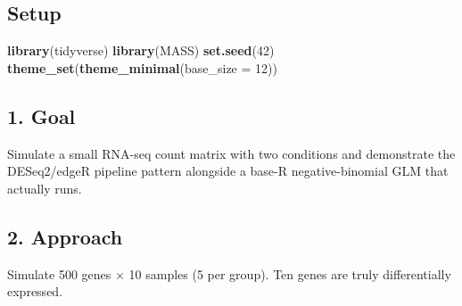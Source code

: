\documentclass[
]{article}
\newenvironment{Shaded}{\begin{snugshade}}{\end{snugshade}}
\newcommand{\AttributeTok}[1]{\textcolor[rgb]{0.13,0.29,0.53}{#1}}
\newcommand{\DecValTok}[1]{\textcolor[rgb]{0.00,0.00,0.81}{#1}}
\newcommand{\FunctionTok}[1]{\textcolor[rgb]{0.13,0.29,0.53}{\textbf{#1}}}
\newcommand{\NormalTok}[1]{#1}
\begin{document}
\subsection{Setup}\label{setup}

\begin{Shaded}
\begin{Highlighting}[]
\FunctionTok{library}\NormalTok{(tidyverse)}
\FunctionTok{library}\NormalTok{(MASS)}
\FunctionTok{set.seed}\NormalTok{(}\DecValTok{42}\NormalTok{)}
\FunctionTok{theme\_set}\NormalTok{(}\FunctionTok{theme\_minimal}\NormalTok{(}\AttributeTok{base\_size =} \DecValTok{12}\NormalTok{))}
\end{Highlighting}
\end{Shaded}

\subsection{1. Goal}\label{goal}

Simulate a small RNA-seq count matrix with two conditions and
demonstrate the DESeq2/edgeR pipeline pattern alongside a base-R
negative-binomial GLM that actually runs.

\subsection{2. Approach}\label{approach}

Simulate 500 genes × 10 samples (5 per group). Ten genes are truly
differentially expressed.
\end{document}
